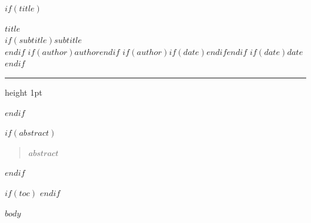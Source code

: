 \documentclass[$if(fontsize)$$fontsize$$else$11pt$endif$,$if(papersize)$$papersize$paper$else$letterpaper$endif$]{article}
\newcommand{\sep}{\enspace{\color{rulecolor}\textbullet}\enspace}
\begin{document}
$if(title)$
\begin{center}
  {\LARGE\bfseries\color{headingcolor} $title$}\\[0.4em]
  $if(subtitle)${\large\itshape $subtitle$}\\[0.4em]$endif$
  {\normalsize
    $if(author)$$author$$endif$%
    $if(author)$$if(date)$\sep$endif$$endif$%
    $if(date)$$date$$endif$%
  }\\[0.2em]
  {\color{rulecolor}\hrule height 1pt}
\end{center}
\vspace{0.5em}
$endif$

$if(abstract)$
\begin{quote}
  \small\itshape $abstract$
\end{quote}
\vspace{0.5em}
$endif$

$if(toc)$
\tableofcontents
\vspace{1em}
\vspace{1em}
$endif$

$body$
\end{document}
